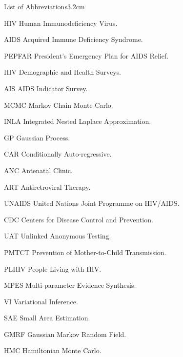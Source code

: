 
\begin{mclistof}{List of Abbreviations}{3.2cm}

\item[HIV] Human Immunodeficiency Virus.
\item[AIDS] Acquired Immune Deficiency Syndrome.
\item[PEPFAR] President’s Emergency Plan for AIDS Relief.
\item[HIV] Demographic and Health Surveys.
\item[AIS] AIDS Indicator Survey.
\item[MCMC] Markov Chain Monte Carlo.
\item[INLA] Integrated Nested Laplace Approximation.
\item[GP] Gaussian Process.
\item[CAR] Conditionally Auto-regressive.
\item[ANC] Antenatal Clinic.
\item[ART] Antiretroviral Therapy.
\item[UNAIDS] United Nations Joint Programme on HIV/AIDS.
\item[CDC] Centers for Disease Control and Prevention.
\item[UAT] Unlinked Anonymous Testing.
\item[PMTCT] Prevention of Mother-to-Child Transmission.
\item[PLHIV] People Living with HIV.
\item[MPES] Multi-parameter Evidence Synthesis.
\item[VI] Variational Inference.
\item[SAE] Small Area Estimation.
\item[GMRF] Gaussian Markov Random Field.
\item[HMC] Hamiltonian Monte Carlo.

\end{mclistof} 

